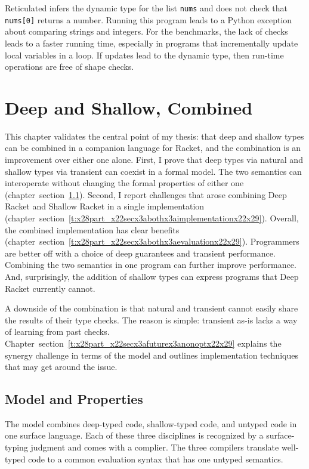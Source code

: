\documentclass[ twoside,open=right,titlepage,numbers=noenddot,headinclude,%
                footinclude=true,cleardoublepage=empty,abstract=off,
                BCOR=5mm,paper=a4,fontsize=11pt,%
                ngerman,american,%
                parts,pdfspacing]{scrreprt}
\newcommand{\sectionNewpage}{}
\newcommand{\SecRef}[2]{section~#1}
\newcommand{\SecRefLocal}[3]{\hyperref[#1]{\SecRef{#2}{#3}}}
\newcommand{\Scribtexttt}[1]{{\texttt{#1}}}
\let\SOriginalthesubsection\thesubsection
\let\SOriginalthesubsubsection\thesubsubsection
\newcommand{\Ssection}[2]{\section[#1]{#2}\let\thesubsection\SOriginalthesubsection}
\newcommand{\Ssubsection}[2]{\subsection[#1]{#2}\let\thesubsubsection\SOriginalthesubsubsection}
\renewcommand{\Ssection}[2]{\chapter[#1]{#2}}
\renewcommand{\Ssubsection}[2]{\section[#1]{#2}}
\renewcommand{\SecRefLocal}[3]{section~\ref{#1}}
\begin{document}
Reticulated infers the dynamic type for the list \Scribtexttt{nums} and does
 not check that \Scribtexttt{nums[0]} returns a number.
Running this program leads to a Python exception about comparing strings
 and integers.
For the benchmarks, the lack of checks leads to a faster running time,
 especially in programs that incrementally update local variables in a loop.
If updates lead to the dynamic type, then run{-}time operations are free of
 shape checks.

\sectionNewpage

\Ssection{Deep and Shallow, Combined}{Deep and Shallow, Combined}\label{t:x28part_x22chapx3abothx22x29}

This chapter validates the central point of my thesis: that deep and shallow types
 can be combined in a companion language for Racket, and the combination is an improvement
 over either one alone.
First, I prove that deep types via natural and shallow types
 via transient can coexist in a formal model.
The two semantics can interoperate without changing the formal properties
 of either one (chapter~\SecRefLocal{t:x28part_x22secx3abothx3amodelx22x29}{6.1}{Model and Properties}).
Second, I report challenges that arose combining Deep Racket and
 Shallow Racket in a single implementation (chapter~\SecRefLocal{t:x28part_x22secx3abothx3aimplementationx22x29}{6.2}{Implementation}).
Overall, the combined implementation has clear benefits (chapter~\SecRefLocal{t:x28part_x22secx3abothx3aevaluationx22x29}{6.3}{Evaluation}).
Programmers are better off with a choice of deep guarantees
 and transient performance.
Combining the two semantics in one program can further improve performance.
And, surprisingly, the addition of shallow types can express programs
 that Deep Racket currently cannot.

A downside of the combination is that natural and transient cannot
 easily share the results of their type checks.
The reason is simple: transient as{-}is lacks a way of learning from past checks.
Chapter~\SecRefLocal{t:x28part_x22secx3afuturex3anonoptx22x29}{7.3}{Improving Deep{--}Transient Interaction} explains the synergy challenge in terms of the
 model and outlines implementation techniques that may get around the issue.

\Ssubsection{Model and Properties}{Model and Properties}\label{t:x28part_x22secx3abothx3amodelx22x29}

The model combines deep{-}typed code, shallow{-}typed code, and
 untyped code in one surface language.
Each of these three disciplines is recognized by a surface{-}typing
 judgment and comes with a complier.
The three compilers translate well{-}typed code to a common evaluation
 syntax that has one untyped semantics.
\end{document}
